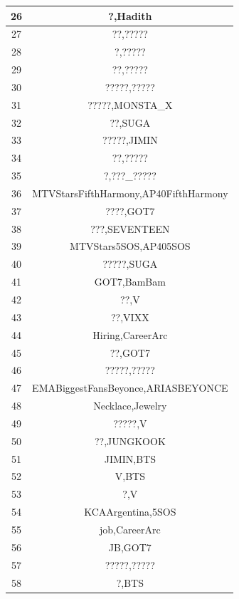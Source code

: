 \documentclass[11pt,a4paper,oneside]{article}
\begin{document}
\begin{center}
\begin{tabular}{|c|c|}
	    	26 & ?,Hadith \\ 
	    	\hline
	    	27 & ??,????? \\ 
	    	\hline
	    	28 & ?,????? \\ 
	    	\hline
	    	29 & ??,????? \\ 
	    	\hline
	    	30 & ?????,????? \\ 
	    	\hline
	    	31 & ?????,MONSTA\_X \\ 
	    	\hline
	    	32 & ??,SUGA \\ 
	    	\hline
	    	33 & ?????,JIMIN \\ 
	    	\hline
	    	34 & ??,????? \\ 
	    	\hline
	    	35 & ?,???\_????? \\ 
	    	\hline
	    	36 & MTVStarsFifthHarmony,AP40FifthHarmony \\ 
	    	\hline
	    	37 & ????,GOT7 \\ 
	    	\hline
	    	38 & ???,SEVENTEEN \\ 
	    	\hline
	    	39 & MTVStars5SOS,AP405SOS \\ 
	    	\hline
	    	40 & ?????,SUGA \\ 
	    	\hline
	    	41 & GOT7,BamBam \\ 
	    	\hline
	    	42 & ??,V \\ 
	    	\hline
	    	43 & ??,VIXX \\ 
	    	\hline
	    	44 & Hiring,CareerArc \\ 
	    	\hline
	    	45 & ??,GOT7 \\ 
	    	\hline
	    	46 & ?????,????? \\ 
	    	\hline
	    	47 & EMABiggestFansBeyonce,ARIASBEYONCE \\ 
	    	\hline
	    	48 & Necklace,Jewelry \\ 
	    	\hline
	    	49 & ?????,V \\ 
	    	\hline
	    	50 & ??,JUNGKOOK \\ 
	    	\hline
	    	51 & JIMIN,BTS \\ 
	    	\hline
	    	52 & V,BTS \\ 
	    	\hline
	    	53 & ?,V \\ 
	    	\hline
	    	54 & KCAArgentina,5SOS \\ 
	    	\hline
	    	55 & job,CareerArc \\ 
	    	\hline
	    	56 & JB,GOT7 \\ 
	    	\hline
	    	57 & ?????,????? \\ 
	    	\hline
	    	58 & ?,BTS \\ 

\end{tabular}
\end{center}
\end{document}

